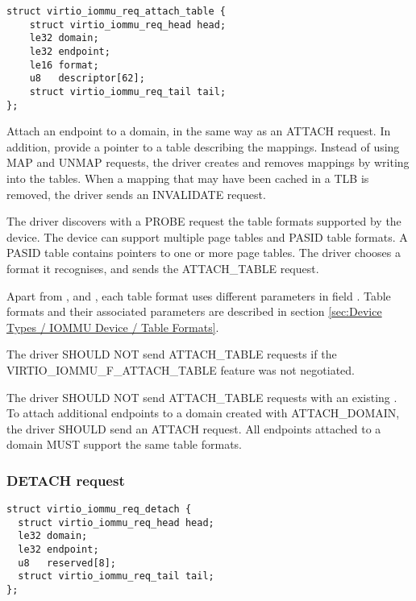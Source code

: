 \begin{lstlisting}
struct virtio_iommu_req_attach_table {
	struct virtio_iommu_req_head head;
	le32 domain;
	le32 endpoint;
	le16 format;
	u8   descriptor[62];
	struct virtio_iommu_req_tail tail;
};
\end{lstlisting}

Attach an endpoint to a domain, in the same way as an ATTACH
request. In addition, provide a pointer to a table describing the
mappings. Instead of using MAP and UNMAP requests, the driver
creates and removes mappings by writing into the tables. When a
mapping that may have been cached in a TLB is removed, the driver
sends an INVALIDATE request.

The driver discovers with a PROBE request the table formats
supported by the device. The device can support multiple page
tables and PASID table formats. A PASID table contains pointers
to one or more page tables. The driver chooses a format it
recognises, and sends the ATTACH_TABLE request.

Apart from ,  and ,
each table format uses different parameters in field
. Table formats and their associated parameters
are described in section \ref{sec:Device Types / IOMMU Device /
Table Formats}.


The driver SHOULD NOT send ATTACH_TABLE requests if the
VIRTIO_IOMMU_F_ATTACH_TABLE feature was not negotiated.

The driver SHOULD NOT send ATTACH_TABLE requests with an existing
. To attach additional endpoints to a domain
created with ATTACH_DOMAIN, the driver SHOULD send an ATTACH
request. All endpoints attached to a domain MUST support the same
table formats.

\subsubsection{DETACH request}

\begin{lstlisting}
struct virtio_iommu_req_detach {
  struct virtio_iommu_req_head head;
  le32 domain;
  le32 endpoint;
  u8   reserved[8];
  struct virtio_iommu_req_tail tail;
};
\end{lstlisting}

